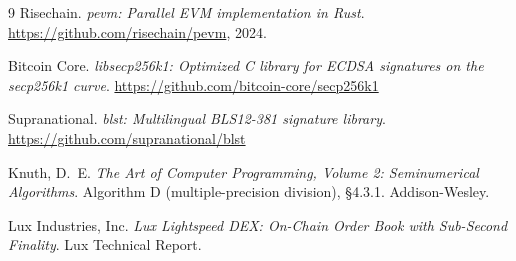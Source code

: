 \begin{thebibliography}{9}
Risechain.
\emph{pevm: Parallel EVM implementation in Rust}.
\url{https://github.com/risechain/pevm}, 2024.

Bitcoin Core.
\emph{libsecp256k1: Optimized C library for ECDSA signatures on the secp256k1 curve}.
\url{https://github.com/bitcoin-core/secp256k1}

Supranational.
\emph{blst: Multilingual BLS12-381 signature library}.
\url{https://github.com/supranational/blst}

Knuth, D.~E.
\emph{The Art of Computer Programming, Volume 2: Seminumerical Algorithms}.
Algorithm D (multiple-precision division), \S 4.3.1. Addison-Wesley.

Lux Industries, Inc.
\emph{Lux Lightspeed DEX: On-Chain Order Book with Sub-Second Finality}.
Lux Technical Report.

\end{thebibliography}

